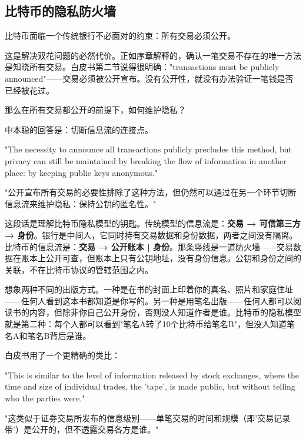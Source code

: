 \documentclass[a4paper,12pt,openany]{ctexbook}
\newenvironment{quoting}{%
  \par\vspace{0.5em}%
  \begin{list}{}{%
    \setlength{\leftmargin}{2em}%
    \setlength{\rightmargin}{2em}%
    \setlength{\parsep}{0.3em}%
    \setlength{\itemsep}{0pt}%
    \setlength{\topsep}{0pt}%
  }%
  \item\relax
}{%
  \end{list}%
  \par\vspace{0.5em}%
}
\begin{document}
\subsection*{比特币的隐私防火墙}


比特币面临一个传统银行不必面对的约束：所有交易必须公开。

这是解决双花问题的必然代价。正如序章解释的，确认一笔交易不存在的唯一方法是知晓所有交易。白皮书第二节说得很明确："transactions must be publicly announced"——交易必须被公开宣布。没有公开性，就没有办法验证一笔钱是否已经被花过。

那么在所有交易都公开的前提下，如何维护隐私？

中本聪的回答是：切断信息流的连接点。


\begin{quoting}
\small
"The necessity to announce all transactions publicly precludes this method, but privacy can still be maintained by breaking the flow of information in another place: by keeping public keys anonymous."

"公开宣布所有交易的必要性排除了这种方法，但仍然可以通过在另一个环节切断信息流来维护隐私：保持公钥的匿名性。"
\end{quoting}


这段话是理解比特币隐私模型的钥匙。传统模型的信息流是：\textbf{交易 → 可信第三方 → 身份}。银行是中间人，它同时持有交易数据和身份数据，两者之间没有隔离。比特币的信息流是：\textbf{交易 → 公开账本 | 身份}。那条竖线是一道防火墙——交易数据在账本上公开可查，但账本上只有公钥地址，没有身份信息。公钥和身份之间的关联，不在比特币协议的管辖范围之内。

想象两种不同的出版方式。一种是在书的封面上印着你的真名、照片和家庭住址——任何人看到这本书都知道是你写的。另一种是用笔名出版——任何人都可以阅读书的内容，但除非你自己公开身份，否则没人知道作者是谁。比特币的隐私模型就是第二种：每个人都可以看到"笔名A转了10个比特币给笔名B"，但没人知道笔名A和笔名B背后是谁。

白皮书用了一个更精确的类比：


\begin{quoting}
\small
"This is similar to the level of information released by stock exchanges, where the time and size of individual trades, the 'tape', is made public, but without telling who the parties were."

"这类似于证券交易所发布的信息级别——单笔交易的时间和规模（即'交易记录带'）是公开的，但不透露交易各方是谁。"
\end{quoting}
\end{document}
